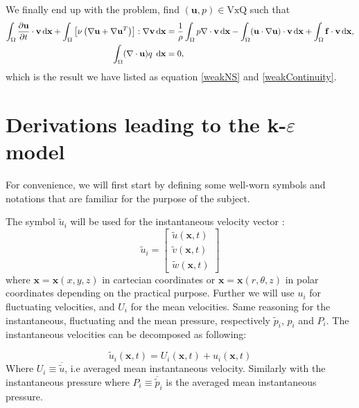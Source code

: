 \documentclass[11pt]{article}
\begin{document}
{We finally end up with the problem, find $(\mathbf{u},p) \in\text{VxQ}$ such that
\begin{align*}
\int_\Omega\frac{\partial\mathbf{u}}{\partial t} \cdot \mathbf{v}\,\mathrm d\mathbf{x}
+ \int_\Omega \left[\nu \left(\nabla\mathbf{u} + \nabla\mathbf{u}^T \right)  
\right] : \nabla \mathbf{v}\,\mathrm d\mathbf{x}
&= \frac{1}{\rho}\int_\Omega  p\nabla \cdot \mathbf{v}\,\mathrm d\mathbf{x} 
- \int_\Omega (\mathbf{u}\cdot\nabla \mathbf{u}) \cdot \mathbf{v}\,\mathrm d\mathbf{x}
+ \int_\Omega \mathbf{f} \cdot \mathbf{v}\,\mathrm d\mathbf{x}, \\
\int_\Omega (\nabla \cdot \mathbf{u}) q \hspace{1mm}\,\mathrm d\mathbf{x} &= 0,
\end{align*}
which is the result we have listed as equation \eqref{weakNS} and \eqref{weakContinuity}.



\section{Derivations leading to the k-$\varepsilon$ model}

For convenience, we will first start by defining some well-worn symbols and 
notations that are familiar for the purpose of the subject. 

The symbol $\tilde{u}_{i}$ will be used for the instantaneous velocity vector :
\begin{equation}
\label{1}
\tilde{u}_{i}=\left[\begin{array}{c}
\tilde{u}(\boldsymbol{x},t)\\
\tilde{v}(\boldsymbol{x},t)\\
\tilde{w}(\boldsymbol{x},t)
\end{array}\right]
\end{equation}
where $\boldsymbol{x}=\boldsymbol{x}(x,y,z)$ in cartecian coordinates
or $\boldsymbol{x}=\boldsymbol{x}(r,\theta,z)$ in polar coordinates
depending on the practical purpose. Further we will use $u_{i}$ for
fluctuating velocities, and $U_{i}$ for the mean velocities. Same
reasoning for the instantaneous, fluctuating and the mean pressure,
respectively $\tilde{p}_{i}$, $p_{i}$ and $P_{i}$. The instantaneous
velocities can be decomposed as following:

\begin{equation}
\label{2}
\tilde{u}_{i}(\boldsymbol{x},t)=U_{i}(\boldsymbol{x},t)+u_{i}(\boldsymbol{x},t)
\end{equation}
Where $U_{i}\equiv\overline{\tilde{u}}$, i.e averaged mean instantaneous
velocity. Similarly with the instantaneous pressure where $P_{i}\equiv\overline{\tilde{p}}_{i}$
is the averaged mean instantaneous pressure. 


}
\end{document}
